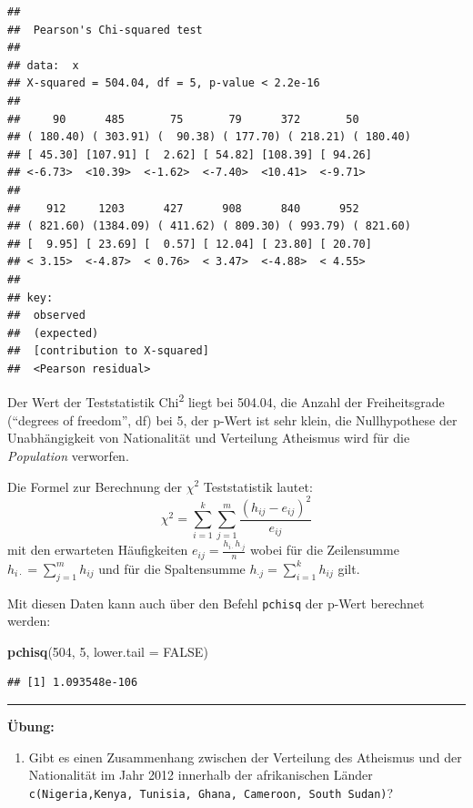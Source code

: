 \documentclass[12pt,ngerman,paper=a4,pagesize,DIV=13]{scrreprt}
\newenvironment{Shaded}{\begin{snugshade}}{\end{snugshade}}
\newcommand{\DataTypeTok}[1]{\textcolor[rgb]{0.13,0.29,0.53}{#1}}
\newcommand{\DecValTok}[1]{\textcolor[rgb]{0.00,0.00,0.81}{#1}}
\newcommand{\KeywordTok}[1]{\textcolor[rgb]{0.13,0.29,0.53}{\textbf{#1}}}
\newcommand{\NormalTok}[1]{#1}
\newcommand{\OtherTok}[1]{\textcolor[rgb]{0.56,0.35,0.01}{#1}}
\providecommand{\tightlist}{%
  \setlength{\itemsep}{0pt}\setlength{\parskip}{0pt}}
\begin{document}
\begin{verbatim}
## 
##  Pearson's Chi-squared test
## 
## data:  x
## X-squared = 504.04, df = 5, p-value < 2.2e-16
## 
##     90      485       75       79      372       50  
## ( 180.40) ( 303.91) (  90.38) ( 177.70) ( 218.21) ( 180.40)
## [ 45.30] [107.91] [  2.62] [ 54.82] [108.39] [ 94.26]
## <-6.73>  <10.39>  <-1.62>  <-7.40>  <10.41>  <-9.71> 
##            
##    912     1203      427      908      840      952  
## ( 821.60) (1384.09) ( 411.62) ( 809.30) ( 993.79) ( 821.60)
## [  9.95] [ 23.69] [  0.57] [ 12.04] [ 23.80] [ 20.70]
## < 3.15>  <-4.87>  < 0.76>  < 3.47>  <-4.88>  < 4.55> 
##            
## key:
##  observed
##  (expected)
##  [contribution to X-squared]
##  <Pearson residual>
\end{verbatim}

Der Wert der Teststatistik Chi\textsuperscript{2} liegt bei 504.04, die
Anzahl der Freiheitsgrade (\enquote{degrees of freedom}, df) bei 5, der
p-Wert ist sehr klein, die Nullhypothese der Unabhängigkeit von
Nationalität und Verteilung Atheismus wird für die \emph{Population}
verworfen.

Die Formel zur Berechnung der \(\chi^2\) Teststatistik lautet:
\[\chi^2=\sum_{i=1}^{k}\sum_{j=1}^{m}\frac{(h_{ij}-e_{ij})^{2}}{e_{ij}}\]
mit den erwarteten Häufigkeiten
\(e_{ij}=\frac{h_{i\cdot}h_{\cdot j}}{n}\) wobei für die Zeilensumme
\(h_{i\cdot}=\sum_{j=1}^{m}h_{ij}\) und für die Spaltensumme
\(h_{\cdot j}=\sum_{i=1}^{k}h_{ij}\) gilt.

Mit diesen Daten kann auch über den Befehl \texttt{pchisq} der p-Wert
berechnet werden:

\begin{Shaded}
\begin{Highlighting}[]
\KeywordTok{pchisq}\NormalTok{(}\DecValTok{504}\NormalTok{, }\DecValTok{5}\NormalTok{, }\DataTypeTok{lower.tail =} \OtherTok{FALSE}\NormalTok{)}
\end{Highlighting}
\end{Shaded}

\begin{verbatim}
## [1] 1.093548e-106
\end{verbatim}

\begin{center}\rule{0.5\linewidth}{\linethickness}\end{center}

\textbf{Übung:}

\begin{enumerate}
\def\labelenumi{\arabic{enumi}.}
\setcounter{enumi}{6}
\tightlist
\item
  Gibt es einen Zusammenhang zwischen der Verteilung des Atheismus und
  der Nationalität im Jahr 2012 innerhalb der afrikanischen Länder
  \texttt{c(\textquotesingle{}Nigeria\textquotesingle{},\textquotesingle{}Kenya\textquotesingle{},\ \textquotesingle{}Tunisia\textquotesingle{},\ \textquotesingle{}Ghana\textquotesingle{},\ \textquotesingle{}Cameroon\textquotesingle{},\ \textquotesingle{}South\ Sudan\textquotesingle{})}?
\end{enumerate}
\end{document}
